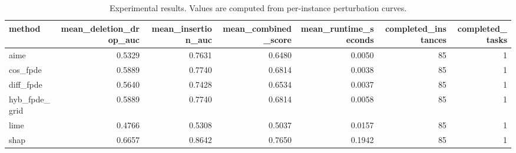 \begin{table}[t]
\caption{Experimental results. Values are computed from per-instance perturbation curves.}
\label{tab:main_results_computed}
\centering
\begin{tabular}{lrrrrrr}
\toprule
method & mean\_deletion\_drop\_auc & mean\_insertion\_auc & mean\_combined\_score & mean\_runtime\_seconds & completed\_instances & completed\_tasks \\
\midrule
aime & 0.5329 & 0.7631 & 0.6480 & 0.0050 & 85 & 1 \\
cos\_fpde & 0.5889 & 0.7740 & 0.6814 & 0.0038 & 85 & 1 \\
diff\_fpde & 0.5640 & 0.7428 & 0.6534 & 0.0037 & 85 & 1 \\
hyb\_fpde\_grid & 0.5889 & 0.7740 & 0.6814 & 0.0058 & 85 & 1 \\
lime & 0.4766 & 0.5308 & 0.5037 & 0.0157 & 85 & 1 \\
shap & 0.6657 & 0.8642 & 0.7650 & 0.1942 & 85 & 1 \\
\bottomrule
\end{tabular}

\end{table}
